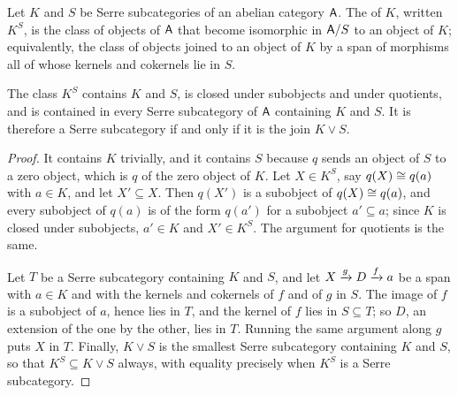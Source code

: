 \begin{definition}
  \label{D:Saturation}  \leanok
  Let \(K\) and \(S\) be Serre subcategories of an abelian category \(\mathsf{A}\). The  of \(K\), written \(K^{S}\), is the class of objects of \(\mathsf{A}\) that become isomorphic in \(\mathsf{A}/S\) to an object of \(K\); equivalently, the class of objects joined to an object of \(K\) by a span of morphisms all of whose kernels and cokernels lie in \(S\).
\end{definition}

\begin{proposition}
  \label{P:Saturation}  
  The class \(K^{S}\) contains \(K\) and \(S\), is closed under subobjects and under quotients, and is contained in every Serre subcategory of \(\mathsf{A}\) containing \(K\) and \(S\). It is therefore a Serre subcategory if and only if it is the join \(K\vee S\).
\end{proposition}

\begin{proof}
  
  It contains \(K\) trivially, and it contains \(S\) because \(q\) sends an object of \(S\) to a zero object, which is \(q\) of the zero object of \(K\). Let \(X\in K^{S}\), say \(q(X)\cong q(a)\) with \(a\in K\), and let \(X'\subseteq X\). Then \(q(X')\) is a subobject of \(q(X)\cong q(a)\), and every subobject of \(q(a)\) is of the form \(q(a')\) for a subobject \(a'\subseteq a\); since \(K\) is closed under subobjects, \(a'\in K\) and \(X'\in K^{S}\). The argument for quotients is the same.

	Let \(T\) be a Serre subcategory containing \(K\) and \(S\), and let \(X\xrightarrow[]{g}D\xrightarrow[]{f}a\) be a span with \(a\in K\) and with the kernels and cokernels of \(f\) and of \(g\) in \(S\). The image of \(f\) is a subobject of \(a\), hence lies in \(T\), and the kernel of \(f\) lies in \(S\subseteq T\); so \(D\), an extension of the one by the other, lies in \(T\). Running the same argument along \(g\) puts \(X\) in \(T\). Finally, \(K\vee S\) is the smallest Serre subcategory containing \(K\) and \(S\), so that \(K^{S}\subseteq K\vee S\) always, with equality precisely when \(K^{S}\) is a Serre subcategory.
\end{proof}

